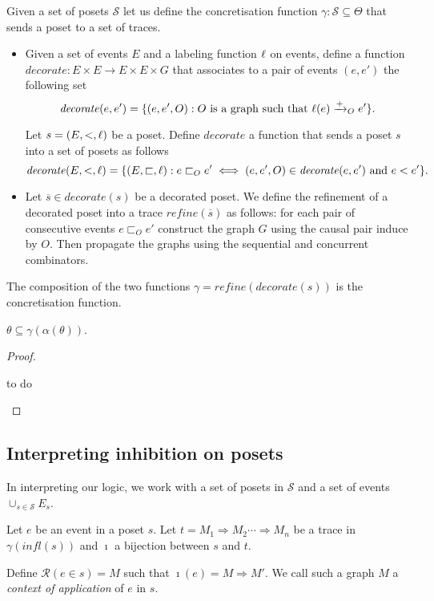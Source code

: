 \begin{definition}
  Given a set of posets $\mathcal{S}$ let us define the concretisation function $\gamma:\mathcal{S}\subseteq\Theta$ that sends a poset to a set of traces.
  \begin{itemize}
  \item
    Given a set of events $E$ and a labeling function $\ell$ on events, define a function $\mathit{decorate}:E\times E \to E\times E\times G$ that associates to a pair of events $(e,e')$ the following set
    \[
    \mathit{decorate}(e,e') = \{(e,e',O) : O\text{ is a graph such that }\ell(e)\mathrel{\xrightarrow{+}}_O e'\}.
    \]

    Let $s = (E,<,\ell)$ be a poset. Define $\mathit{decorate}$ a function that sends a poset $s$ into a set of posets as follows
    \[
    \mathit{decorate}(E,<,\ell) =\{(E,\sqsubset,\ell) : e\sqsubset_O e' \iff (e,e',O)\in\mathit{decorate}(e,e')\text{ and }
    e<e'\}.
    \]
  \item Let $\overline{s}\in\mathit{decorate}(s)$ be a decorated poset. We define the refinement of a decorated poset into a trace $\mathit{refine}(\overline{s})$ as follows: for each pair of consecutive events $e \sqsubset_O e'$ construct the graph $G$ using the causal pair induce by $O$. Then propagate the graphs using the sequential and concurrent combinators.
  \end{itemize}
  The composition of the two functions $\gamma = \mathit{refine}(\mathit{decorate}(s))$ is the concretisation function.
\end{definition}

\begin{lemma}
  $\theta\subseteq \gamma(\alpha(\theta))$.
\end{lemma}
\begin{proof}
    \begin{mdframed}[backgroundcolor=blue!20]
    to do
  \end{mdframed}

\end{proof}

\subsection{Interpreting inhibition on posets}

In interpreting our logic, we work with a set of posets in $\mathcal{S}$ and a set of events $\cup_{s\in\mathcal{S}} E_s$.

\begin{definition}
  Let $e$ be an event in a poset $s$. Let $t = M_1{\Rightarrow} M_2\cdots {\Rightarrow} M_n$ be a trace in $\gamma(\textit{infl}(s))$ and $\imath$ a bijection between $s$ and $t$.

  Define $\mathcal{R}(e\in s) = M$ such that $\imath(e) = M{\Rightarrow}M'$. We call such a graph $M$ a \emph{context of application} of $e$ in $s$.
\end{definition}


